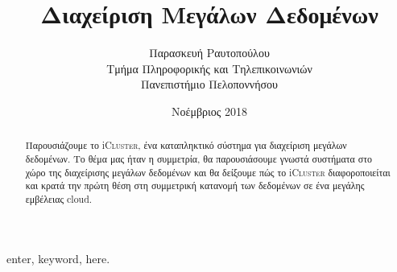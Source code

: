 \documentclass[a4paper]{article}
\title{Διαχείριση Μεγάλων Δεδομένων}
\author{Παρασκευή Ραυτοπούλου \\
Τμήμα Πληροφορικής και Τηλεπικοινωνιών \\
Πανεπιστήμιο Πελοποννήσου}
\date{Νοέμβριος 2018}
\begin{document}
\maketitle

\begin{abstract}
Παρουσιάζουμε το  i\textsc{Cluster},  ένα καταπληκτικό σύστημα για διαχείριση μεγάλων δεδομένων. Το θέμα μας ήταν η συμμετρία, θα παρουσιάσουμε γνωστά συστήματα στο χώρο της διαχείρισης μεγάλων δεδομένων και θα δείξουμε πώς το  i\textsc{Cluster}  διαφοροποιείται και κρατά την πρώτη θέση στη συμμετρική κατανομή των δεδομένων σε ένα μεγάλης εμβέλειας  cloud.   
\end{abstract}

 enter, keyword, here.







\end{document}
